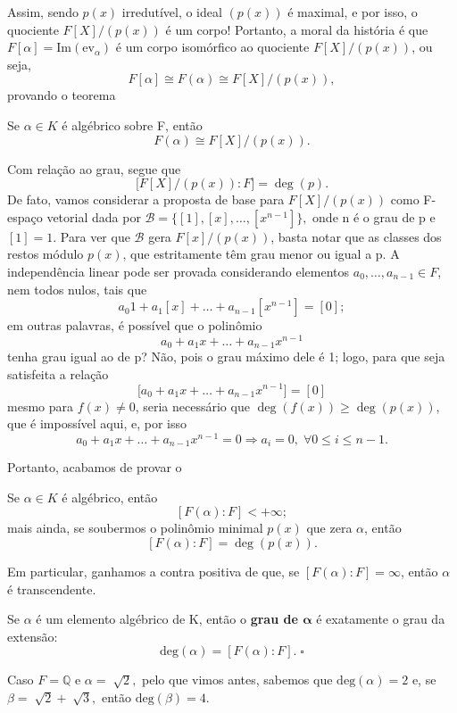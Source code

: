 \documentclass[../algebraIII_notes.tex]{subfiles}
\begin{document}
Assim, sendo \(p(x)\) irredutível, o ideal \((p(x))\) é maximal, e por isso, o quociente \(F[X]/(p(x))\) é um corpo!
Portanto, a moral da história é que \(F[\alpha ]=\mathrm{Im}(\mathrm{ev}_{\alpha })\) é um corpo isomórfico ao quociente \(F[X]/(p(x))\), ou seja,
\[
	F[\alpha ]\cong F(\alpha )\cong F[X]/(p(x)),
\]
provando o teorema
\begin{theorem*}
	Se \(\alpha \in K\) é algébrico sobre F, então
	\[
		F(\alpha )\cong F[X]/(p(x)).
	\]
\end{theorem*}
Com relação ao grau, segue que
\[
	\biggl[F[X]/(p(x)):F\biggr] = \deg{(p)}.
\]
De fato, vamos considerar a proposta de base para \(F[X]/(p(x))\) como F-espaço vetorial dada por \(\mathcal{B}=\{[1], [x], \dotsc , [x^{n-1}]\},\) onde n é o grau de p e \([1]=1\).
Para ver que \(\mathcal{B}\) gera \(F[x]/(p(x))\), basta notar que as classes dos restos módulo \(p(x)\), que estritamente têm grau menor ou igual a p.
A independência linear pode ser provada considerando elementos \(a_{0}, \dotsc , a_{n-1}\in F\), nem todos nulos, tais que
\[
	a_{0}1+a_1[x]+\dotsc +a_{n-1}[x^{n-1}]=[0];
\]
em outras palavras, é possível que o polinômio
\[
	a_{0}+a_1x+\dotsc +a_{n-1}x^{n-1}
\]
tenha grau igual ao de p? Não, pois o grau máximo dele é 1; logo, para que seja satisfeita a relação
\[
	\biggl[a_{0}+a_1x+\dotsc +a_{n-1}x^{n-1}\biggr] = [0]
\]
mesmo para \(f(x)\neq 0\), seria necessário que \(\deg{(f(x))}\geq \deg{(p(x))}\), que é impossível aqui, e, por isso
\[
	a_{0}+a_1x+\dotsc +a_{n-1}x^{n-1}=0 \Rightarrow a_{i}=0,\; \forall 0\leq i\leq n-1.
\]

Portanto, acabamos de provar o
\begin{crl*}
	Se \(\alpha \in K\) é algébrico, então
	\[
		[F(\alpha ):F] < +\infty;
	\]
	mais ainda, se soubermos o polinômio minimal \(p(x)\) que zera \(\alpha \), então
	\[
		[F(\alpha ):F]=\deg{(p(x))}.
	\]
\end{crl*}
Em particular, ganhamos a contra positiva de que, se \([F(\alpha ):F]=\infty\), então \(\alpha \) é transcendente.

\begin{def*}
	Se \(\alpha \) é um elemento algébrico de K, então o \textbf{grau de \(\mathbf{\alpha} \)} é exatamente o grau da extensão:
	\[
		\mathrm{deg}(\alpha )=[F(\alpha ):F].\; \square
	\]
\end{def*}
\begin{example}
	Caso \(F=\mathbb{Q}\) e \(\alpha = \sqrt[]{2},\) pelo que vimos antes, sabemos que \(\mathrm{deg}(\alpha )=2\) e, se \(\beta =\sqrt[]{2}+\sqrt[]{3},\) então \(\mathrm{deg}(\beta )=4.\)
\end{example}
\end{document}

